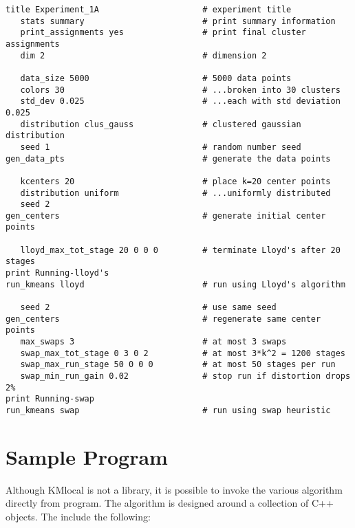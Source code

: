 \documentclass[11pt]{article}		%
\begin{document}
{\small\begin{verbatim}
title Experiment_1A                     # experiment title
   stats summary                        # print summary information
   print_assignments yes                # print final cluster assignments
   dim 2                                # dimension 2
  
   data_size 5000                       # 5000 data points
   colors 30                            # ...broken into 30 clusters
   std_dev 0.025                        # ...each with std deviation 0.025
   distribution clus_gauss              # clustered gaussian distribution
   seed 1                               # random number seed
gen_data_pts                            # generate the data points
 
   kcenters 20                          # place k=20 center points
   distribution uniform                 # ...uniformly distributed
   seed 2
gen_centers                             # generate initial center points
  
   lloyd_max_tot_stage 20 0 0 0         # terminate Lloyd's after 20 stages
print Running-lloyd's
run_kmeans lloyd                        # run using Lloyd's algorithm
 
   seed 2                               # use same seed
gen_centers                             # regenerate same center points
   max_swaps 3                          # at most 3 swaps
   swap_max_tot_stage 0 3 0 2           # at most 3*k^2 = 1200 stages
   swap_max_run_stage 50 0 0 0          # at most 50 stages per run
   swap_min_run_gain 0.02               # stop run if distortion drops 2%
print Running-swap
run_kmeans swap                         # run using swap heuristic
\end{verbatim}}

\section{Sample Program}

Although KMlocal is not a library, it is possible to invoke the
various algorithm directly from program.  The algorithm is designed
around a collection of C++ objects.  The include the following:
\end{document}
